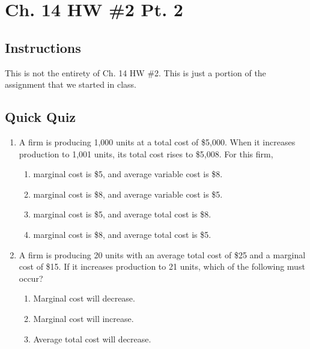 \documentclass{article}
\begin{document}
\section*{Ch. 14 HW \#2 Pt. 2}

\subsection*{Instructions} This is not the entirety of Ch. 14 HW \#2. This is just a portion of the assignment that we started in class.

\subsection*{Quick Quiz}

\begin{enumerate}

\item A firm is producing 1,000 units at a total cost of \$5,000. When it increases production to 1,001 units, its total cost rises to \$5,008. For this firm,

	\begin{enumerate}
	
	\item marginal cost is \$5, and average variable cost is \$8.
	
	\item marginal cost is \$8, and average variable cost is \$5. 
	
	\item marginal cost is \$5, and average total cost is \$8.
	
	\item marginal cost is \$8, and average total cost is \$5.
	
	\end{enumerate}
	
\item A firm is producing 20 units with an average total cost of \$25 and a marginal cost of \$15. If it increases production to 21 units, which of the following must occur?

	\begin{enumerate}
	
	\item Marginal cost will decrease.
	
	\item Marginal cost will increase.
	
	\item Average total cost will decrease.
	

\end{enumerate}
\end{enumerate}
\end{document}
